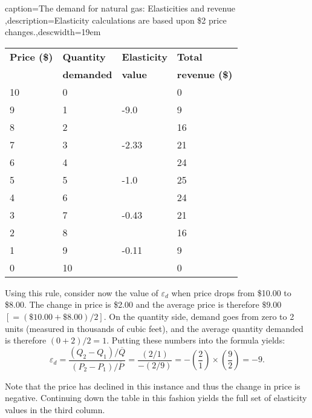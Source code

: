 \newhtmlpage

\begin{Table}{caption={The demand for natural gas: Elasticities and revenue \label{table:gaselastrev}},description={Elasticity calculations are based upon \$2 price changes.},descwidth={19em}}
\begin{tabu} to \linewidth {|X[1,c]X[1,c]X[1,c]X[1,c]|} \hline 
{}\textbf{Price (\$)} & \textbf{Quantity} & \textbf{Elasticity} & \textbf{Total} \\[-0.1em]
	&	\textbf{demanded}	&	\textbf{value}	&	\textbf{revenue (\$)}	\\	 & 0 &  & 0 \\ 
	9 & 1 & -9.0 & 9 \\ 
						8 & 2 &  & 16 \\ 
	7 & 3 & -2.33 & 21 \\ 
						6 & 4 &  & 24 \\ 
	5 & 5 & -1.0 & 25 \\ 
						4 & 6 &  & 24 \\ 
	3 & 7 & -0.43 & 21 \\ 
						2 & 8 &  & 16 \\ 
	1 & 9 & -0.11 & 9 \\ 
						0 & 10 &  & 0 \\ \hline 
\end{tabu}
\end{Table}



\newhtmlpage

Using this rule, consider now the value of $\varepsilon_{d}$ when price
drops from \$10.00 to \$8.00. The change in price is \$2.00 and the
average price is therefore $\$9.00$ $[=(\$10.00+\$8.00)/2]$. On the quantity
side, demand goes from zero to 2 units (measured in thousands of cubic
feet), and the average quantity demanded is therefore $(0+2)/2=1$. Putting
these numbers into the formula yields:
\begin{equation*}
\varepsilon_{d}=\frac{(Q_{2}-Q_{1})/\overline{Q}}{(P_{2}-P_{1})/\overline{P}
}=\frac{(2/1)}{-(2/9)}=-\left(\frac{2}{1}\right)\times\left(\frac{9}{2}\right)=-9. 
\end{equation*}

Note that the price has declined in this instance and thus the change in
price is negative. Continuing down the table in this fashion yields the full
set of elasticity values in the third column.

